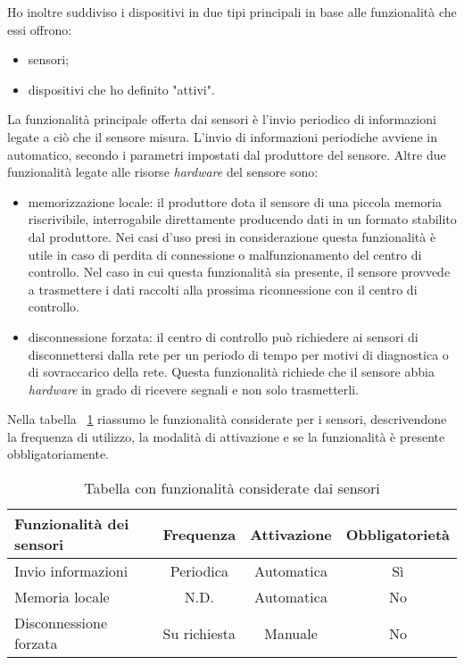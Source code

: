 Ho inoltre suddiviso i dispositivi in due tipi principali in base alle funzionalità che essi offrono:
\begin{itemize}
	\item sensori;
	\item dispositivi che ho definito "attivi".
\end{itemize}
La funzionalità principale offerta dai sensori è l'invio periodico di informazioni legate a ciò che il sensore misura.
L'invio di informazioni periodiche avviene in automatico, secondo i parametri impostati dal produttore del sensore.
Altre due funzionalità legate alle risorse \emph{hardware} del sensore sono:
\begin{itemize}
	\item memorizzazione locale: il produttore dota il sensore di una piccola memoria riscrivibile, interrogabile direttamente producendo dati in un formato stabilito dal produttore. Nei casi d'uso presi in considerazione questa funzionalità è utile in caso di perdita di connessione o malfunzionamento del centro di controllo. Nel caso in cui questa funzionalità sia presente, il sensore provvede a trasmettere i dati raccolti alla prossima riconnessione con il centro di controllo.
	\item disconnessione forzata: il centro di controllo può richiedere ai sensori di disconnettersi dalla rete per un periodo di tempo per motivi di diagnostica o di sovraccarico della rete. Questa funzionalità richiede che il sensore abbia \emph{hardware} in grado di ricevere segnali e non solo trasmetterli.
\end{itemize}

Nella tabella ~\ref{tab:funz-sensori} riassumo le funzionalità considerate per i sensori, descrivendone la frequenza di utilizzo, la modalità di attivazione e se la funzionalità è presente obbligatoriamente.

\begin{table}[H]
\caption{Tabella con funzionalità considerate dai sensori}
\label{tab:funz-sensori}
\begin{tabularx}{\linewidth}{|X|c|c|c|}
\hline
\textbf{Funzionalità dei sensori} & \textbf{Frequenza} & \textbf{Attivazione} & \textbf{Obbligatorietà} \\
\hline
Invio informazioni & Periodica & Automatica & Sì \\
\hline
Memoria locale & N.D. & Automatica & No \\
\hline
Disconnessione forzata & Su richiesta & Manuale & No \\
\hline
\end{tabularx}
\end{table}

